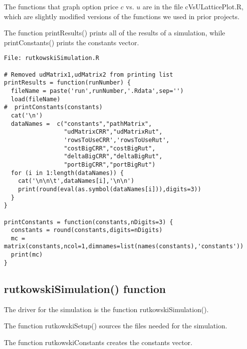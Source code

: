 \documentclass[10pt]{article}
\begin{document}
The functions that graph option price $c$ vs. $u$ are in the
file cVsULatticePlot.R, which are slightly modified versions
of the functions we used in prior projects.

The function printResults()  prints all of the
results of a simulation, while printConstants() prints the constants vector.

\begin{verbatim}
File: rutkowskiSimulation.R

# Removed udMatrix1,udMatrix2 from printing list
printResults = function(runNumber) {
  fileName = paste('run',runNumber,'.Rdata',sep='')
  load(fileName)
#  printConstants(constants)
  cat('\n')
  dataNames =  c("constants","pathMatrix",
                 "udMatrixCRR","udMatrixRut",
                 'rowsToUseCRR','rowsToUseRut',
                 "costBigCRR","costBigRut",
                 "deltaBigCRR","deltaBigRut",
                 "portBigCRR","portBigRut")
  for (i in 1:length(dataNames)) {
    cat('\n\n\t',dataNames[i],'\n\n')
    print(round(eval(as.symbol(dataNames[i])),digits=3))
  }
}

printConstants = function(constants,nDigits=3) {
  constants = round(constants,digits=nDigits)
  mc = matrix(constants,ncol=1,dimnames=list(names(constants),'constants'))
  print(mc)
}
\end{verbatim}


\subsection*{rutkowskiSimulation() function}

The driver for the simulation is the function rutkowskiSimulation().

The function rutkowskiSetup() sources the files needed for the simulation.

The function rutkowskiConstants creates the constants vector.
\end{document}
